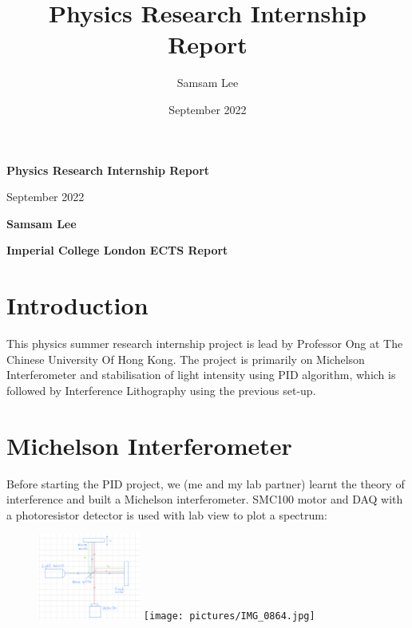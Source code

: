 \documentclass{article}
\begin{document}
\title{Physics Research Internship Report}
\author{Samsam Lee}

\date{September 2022}




\begin{center}
    \Large
    \textbf{Physics Research Internship Report}
        
    \vspace{0.4cm}
    \large
    September 2022
        
    \vspace{0.4cm}
    \textbf{Samsam Lee}
       
    \vspace{0.9cm}
    \textbf{Imperial College London ECTS Report}
\end{center}

\section{Introduction}

This physics summer research internship project is lead by Professor Ong at The Chinese University Of Hong Kong. The project is primarily on Michelson Interferometer and stabilisation of light intensity using PID algorithm, which is followed by Interference Lithography using the previous set-up.


\section{Michelson Interferometer}

Before starting the PID project, we (me and my lab partner) learnt the theory of interference and built a Michelson interferometer. SMC100 motor and DAQ with a photoresistor detector is used with lab view to plot a spectrum:

\begin{figure}[H]
\centering
\includegraphics[width=0.3\textwidth,angle=0,origin=c]{pictures/IMG_4EC45EC59B99-1.jpeg}
\texttt{[image: pictures/IMG\_0864.jpg]}
\end{figure}
\end{document}
